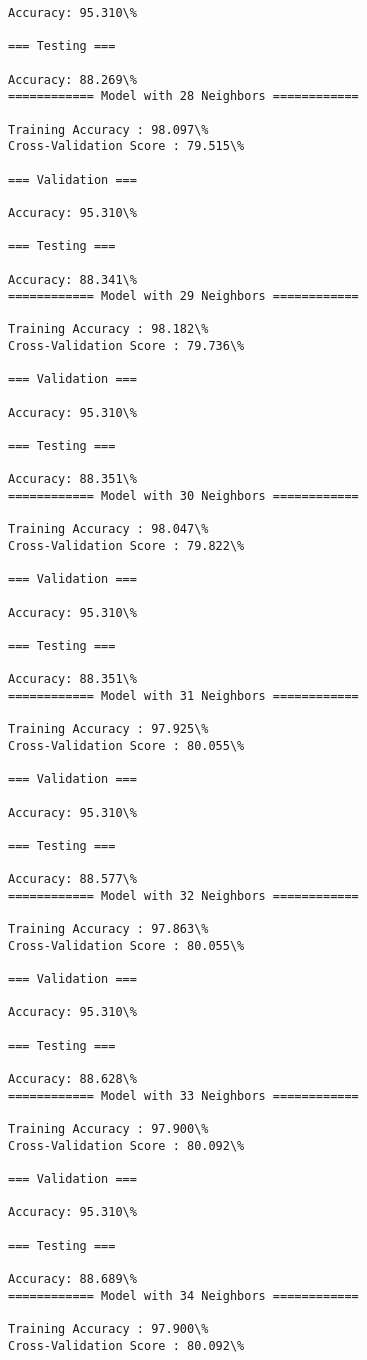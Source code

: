 \documentclass[11pt]{article}
\begin{document}
\begin{Verbatim}[commandchars=\\\{\}]
Accuracy: 95.310\%

=== Testing ===

Accuracy: 88.269\%
============ Model with 28 Neighbors ============

Training Accuracy : 98.097\%
Cross-Validation Score : 79.515\%

=== Validation ===

Accuracy: 95.310\%

=== Testing ===

Accuracy: 88.341\%
============ Model with 29 Neighbors ============

Training Accuracy : 98.182\%
Cross-Validation Score : 79.736\%

=== Validation ===

Accuracy: 95.310\%

=== Testing ===

Accuracy: 88.351\%
============ Model with 30 Neighbors ============

Training Accuracy : 98.047\%
Cross-Validation Score : 79.822\%

=== Validation ===

Accuracy: 95.310\%

=== Testing ===

Accuracy: 88.351\%
============ Model with 31 Neighbors ============

Training Accuracy : 97.925\%
Cross-Validation Score : 80.055\%

=== Validation ===

Accuracy: 95.310\%

=== Testing ===

Accuracy: 88.577\%
============ Model with 32 Neighbors ============

Training Accuracy : 97.863\%
Cross-Validation Score : 80.055\%

=== Validation ===

Accuracy: 95.310\%

=== Testing ===

Accuracy: 88.628\%
============ Model with 33 Neighbors ============

Training Accuracy : 97.900\%
Cross-Validation Score : 80.092\%

=== Validation ===

Accuracy: 95.310\%

=== Testing ===

Accuracy: 88.689\%
============ Model with 34 Neighbors ============

Training Accuracy : 97.900\%
Cross-Validation Score : 80.092\%


\end{Verbatim}
\end{document}
